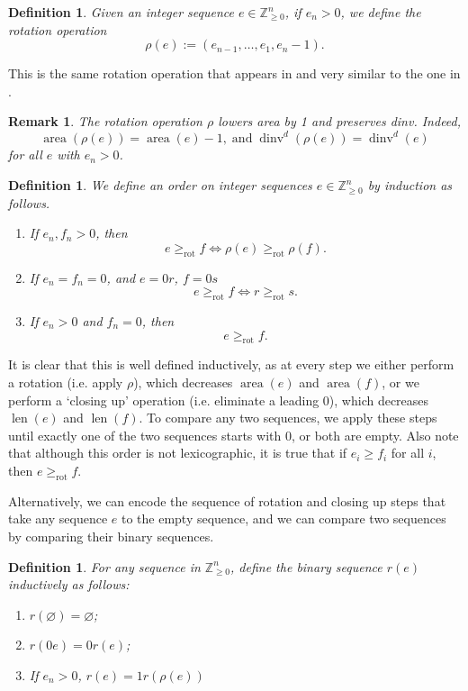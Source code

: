 \documentclass[submission]{FPSAC2027}
\newcommand{\Z}{\mathbb{Z}}
\DeclareMathOperator{\len}{len}
\DeclareMathOperator{\area}{area}
\DeclareMathOperator{\dinv}{dinv}
\newcommand{\rot}{\geq_{\mathrm{rot}}}
\newtheorem{defn}[thm]{Definition}
\newtheorem{remark}[thm]{Remark}
\begin{document}
\begin{defn}
    Given an integer sequence $e \in \Z_{\geq 0}^n$, if $e_n > 0$, we define the rotation operation 
    $$\rho(e) := (e_{n-1}, \dots, e_1, e_n -1).$$ 
\end{defn}
This is the same rotation operation that appears in \cite{Hog17} and very similar to the one in \cite{Haiman}. 
\begin{remark}
    The rotation operation $\rho$ lowers area by 1 and preserves dinv. Indeed,
    $$\area(\rho(e)) = \area(e) - 1, \; \textrm{and} \; \dinv^d(\rho(e)) = \dinv^d(e)$$
    for all $e$ with $e_n > 0$.
\end{remark}
\begin{defn}
    We define an order on integer sequences $e \in \Z_{\geq 0}^n$ by induction as follows.
    \begin{enumerate}
        \item If $e_n, f_n >0$, then
        $$e \rot f \iff \rho(e) \rot \rho(f).$$
        \item If $e_n = f_n = 0$, and $e = 0r$, $f = 0s$
        $$e \rot f \iff r \rot s.$$
        \item If $e_n > 0$ and $f_n = 0$, then
        $$e \rot f.$$
    \end{enumerate}
\end{defn}


It is clear that this is well defined inductively, as at every step we either perform a rotation (i.e. apply $\rho$), which decreases $\area(e)$ and $\area(f)$, or we perform a `closing up' operation (i.e. eliminate a leading $0$), which decreases $\len(e)$ and $ \len(f)$. To compare any two sequences, we apply these steps until exactly one of the two sequences starts with $0$, or both are empty. Also note that although this order is not lexicographic, it is true that if $e_i \geq f_i$ for all $i$, then $e \rot f$.

Alternatively, we can encode the sequence of rotation and closing up steps that take any sequence $e$ to the empty sequence, and we can compare two sequences by comparing their binary sequences.

\begin{defn}
\label{def: binary rot order}
    For any sequence in  $\Z_{\geq 0}^n$, define the binary sequence $r(e)$ inductively as follows:
    \begin{enumerate}
        \item $r(\varnothing) = \varnothing$;
        \item $r(0e) = 0r(e)$;
        \item If $e_n >0$, $r(e) = 1 r(\rho(e))$
    \end{enumerate}
\end{defn}
\end{document}
